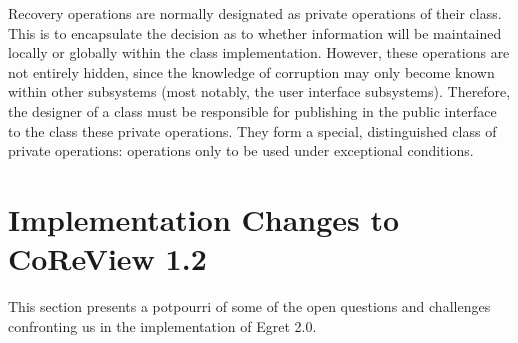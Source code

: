 Recovery operations are normally designated as private operations of
their class.  This is to encapsulate the decision as to whether
information will be maintained locally or globally within the class
implementation.  However, these operations are not entirely hidden,
since the knowledge of corruption may only become known within other
subsystems (most notably, the user interface subsystems).  Therefore,
the designer of a class must be responsible for publishing in the
public interface to the class these private operations.  They form
a special, distinguished class of private operations: operations
only to be used under exceptional conditions. 


\section{Implementation Changes to CoReView 1.2}
\label{app:coreview}

This section presents a potpourri of some of the open questions and challenges 
confronting us in the implementation of Egret 2.0.

